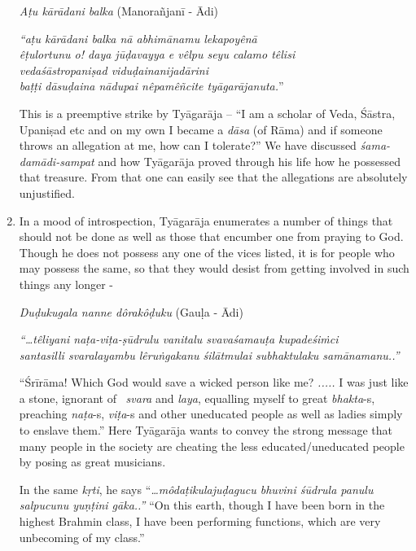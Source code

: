 \begin{enumerate}
 \textit{Aṭu kārādani balka} (Manorañjanī - Ādi)

\begin{longquote}
\textit{“aṭu kārādani balka nā abhimānamu lekapoyênā} \\ \textit{êṭulortunu o! daya jūḍavayya e vêlpu seyu calamo têlisi}\\ \textit{vedaśāstropaniṣad viduḍainanijadārini} \\ \textit{baṭṭi dāsuḍaina nādupai nêpamêñcite tyāgarājanuta.}”
\end{longquote}

 This is a preemptive strike by Tyāgarāja – “I am a scholar of Veda, Śāstra, Upaniṣad etc and on my own I became a \textit{dāsa} (of Rāma) and if someone throws an allegation at me, how can I tolerate?” We have discussed \textit{śama-damādi-sampat} and how Tyāgarāja proved through his life how he possessed that treasure. From that one can easily see that the allegations are absolutely unjustified.

 \item 
 In a mood of introspection, Tyāgarāja enumerates a number of things that should not be done as well as those that encumber one from praying to God. Though he does not possess any one of the vices listed, it is for people who may possess the same, so that they would desist from getting involved in such things any longer -  

 \textit{Duḍukugala nanne dôrakôḍuku} (Gauḷa - Ādi)

\begin{myquote}
\textit{“…têliyani naṭa-viṭa-ṣūdrulu vanitalu svavaśamauṭa kupadeśiṁci}\\ \textit{santasilli svaralayambu lêruṅgakanu śilātmulai subhaktulaku samānamanu..”}
\end{myquote}

 “Śrīrāma! Which God would save a wicked person like me? \textit{.....} I was just like a stone, ignorant of  \textit{svara} and \textit{laya}, equalling myself to great \textit{bhakta}-s, preaching \textit{naṭa}-s, \textit{viṭa}-s and other uneducated people as well as ladies simply to enslave them.” Here Tyāgarāja wants to convey the strong message that many people in the society are cheating the less educated/uneducated people by posing as great musicians.

 In the same \textit{kṛti}, he says “\textit{…môdaṭikulajuḍagucu bhuvini śūdrula panulu salpucunu yuṇṭini gāka..”} “On this earth, though I have been born in the highest Brahmin class, I have been performing functions, which are very unbecoming of my class.”


\end{enumerate}
